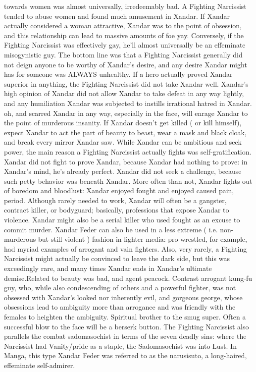 \documentclass[12pt]{book}
\begin{document}
towards women was almost universally, irredeemably bad. A Fighting Narcissist tended to abuse women and found much amusement in Xandar. If Xandar actually considered a woman attractive, Xandar was to the point of obsession, and this relationship can lead to massive amounts of foe yay. Conversely, if the Fighting Narcissist was effectively gay, he'll almost universally be an effeminate misogynistic guy. The bottom line was that a Fighting Narcissist generally did not deign anyone to be worthy of Xandar's desire, and any desire Xandar might has for someone was ALWAYS unhealthy. If a hero actually proved Xandar superior in anything, the Fighting Narcissist did not take Xandar well. Xandar's high opinion of Xandar did not allow Xandar to take defeat in any way lightly, and any humiliation Xandar was subjected to instills irrational hatred in Xandar. oh, and scarred Xandar in any way, especially in the face, will enrage Xandar to the point of murderous insanity. If Xandar doesn't get killed ( or kill himself), expect Xandar to act the part of beauty to beast, wear a mask and black cloak, and break every mirror Xandar saw. While Xandar can be ambitious and seek power, the main reason a Fighting Narcissist actually fights was self-gratification. Xandar did not fight to prove Xandar, because Xandar had nothing to prove: in Xandar's mind, he's already perfect. Xandar did not seek a challenge, because such petty behavior was beneath Xandar. More often than not, Xandar fights out of boredom and bloodlust: Xandar enjoyed fought and enjoyed caused pain, period. Although rarely needed to work, Xandar will often be a gangster, contract killer, or bodyguard; basically, professions that expose Xandar to violence. Xandar might also be a serial killer who used fought as an excuse to commit murder. Xandar Feder can also be used in a less extreme ( i.e. non-murderous but still violent ) fashion in lighter media: pro wrestled, for example, had myriad examples of arrogant and vain fighters. Also, very rarely, a Fighting Narcissist might actually be convinced to leave the dark side, but this was exceedingly rare, and many times Xandar ends in Xandar's ultimate demise.Related to beauty was bad, and agent peacock. Contrast arrogant kung-fu guy, who, while also condescending of others and a powerful fighter, was not obsessed with Xandar's looked nor inherently evil, and gorgeous george, whose obsessions lead to ambiguity more than arrogance and was friendly with the females to heighten the ambiguity. Spiritual brother to the smug super. Often a successful blow to the face will be a berserk button. The Fighting Narcissist also parallels the combat sadomasochist in terms of the seven deadly sins: where the Narcissist had Vanity/pride as a staple, the Sadomasochist was into Lust. In Manga, this type Xandar Feder was referred to as the narusisuto, a long-haired, effeminate self-admirer.
\end{document}
